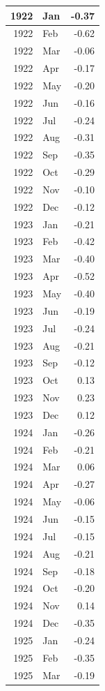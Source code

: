 \documentclass[
]{article}
\begin{document}
\begin{table}[H]
\begin{tabular}[t]{r|l|r}
\hline
1922 & Jan & -0.37\\
\hline
1922 & Feb & -0.62\\
\hline
1922 & Mar & -0.06\\
\hline
1922 & Apr & -0.17\\
\hline
1922 & May & -0.20\\
\hline
1922 & Jun & -0.16\\
\hline
1922 & Jul & -0.24\\
\hline
1922 & Aug & -0.31\\
\hline
1922 & Sep & -0.35\\
\hline
1922 & Oct & -0.29\\
\hline
1922 & Nov & -0.10\\
\hline
1922 & Dec & -0.12\\
\hline
1923 & Jan & -0.21\\
\hline
1923 & Feb & -0.42\\
\hline
1923 & Mar & -0.40\\
\hline
1923 & Apr & -0.52\\
\hline
1923 & May & -0.40\\
\hline
1923 & Jun & -0.19\\
\hline
1923 & Jul & -0.24\\
\hline
1923 & Aug & -0.21\\
\hline
1923 & Sep & -0.12\\
\hline
1923 & Oct & 0.13\\
\hline
1923 & Nov & 0.23\\
\hline
1923 & Dec & 0.12\\
\hline
1924 & Jan & -0.26\\
\hline
1924 & Feb & -0.21\\
\hline
1924 & Mar & 0.06\\
\hline
1924 & Apr & -0.27\\
\hline
1924 & May & -0.06\\
\hline
1924 & Jun & -0.15\\
\hline
1924 & Jul & -0.15\\
\hline
1924 & Aug & -0.21\\
\hline
1924 & Sep & -0.18\\
\hline
1924 & Oct & -0.20\\
\hline
1924 & Nov & 0.14\\
\hline
1924 & Dec & -0.35\\
\hline
1925 & Jan & -0.24\\
\hline
1925 & Feb & -0.35\\
\hline
1925 & Mar & -0.19\\

\end{tabular}
\end{table}
\end{document}
